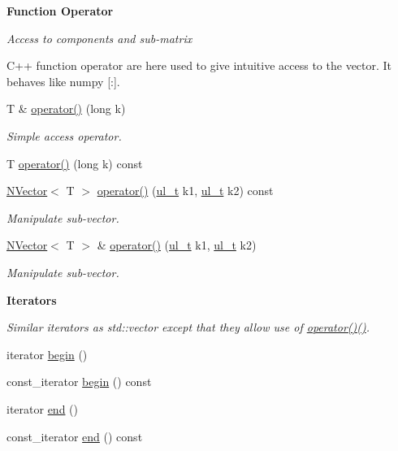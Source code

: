 \begin{Indent}\textbf{ Function Operator}\par
{\em Access to components and sub-\/matrix

C++ function operator are here used to give intuitive access to the vector. It behaves like numpy {\ttfamily \mbox{[}\+:\mbox{]}}. }\begin{DoxyCompactItemize}
\item 
T \& \mbox{\hyperlink{class_n_vector_a3ed21b63fd97af9c63bfacb372f733a5}{operator()}} (long k)
\begin{DoxyCompactList}\small\item\em Simple access operator. \end{DoxyCompactList}\item 
T \mbox{\hyperlink{class_n_vector_a51d4a2c505c1434f45e8f80d1d77eda5}{operator()}} (long k) const
\item 
\mbox{\hyperlink{class_n_vector}{N\+Vector}}$<$ T $>$ \mbox{\hyperlink{class_n_vector_a8778fdc3c0a27a7930fda3f2a7155e96}{operator()}} (\mbox{\hyperlink{group___n_algebra_ga1b140a2034db3f5dfe18a987745df43a}{ul\+\_\+t}} k1, \mbox{\hyperlink{group___n_algebra_ga1b140a2034db3f5dfe18a987745df43a}{ul\+\_\+t}} k2) const
\begin{DoxyCompactList}\small\item\em Manipulate sub-\/vector. \end{DoxyCompactList}\item 
\mbox{\hyperlink{class_n_vector}{N\+Vector}}$<$ T $>$ \& \mbox{\hyperlink{class_n_vector_a98f95a46c34ceaf355e86e9dad9863e1}{operator()}} (\mbox{\hyperlink{group___n_algebra_ga1b140a2034db3f5dfe18a987745df43a}{ul\+\_\+t}} k1, \mbox{\hyperlink{group___n_algebra_ga1b140a2034db3f5dfe18a987745df43a}{ul\+\_\+t}} k2)
\begin{DoxyCompactList}\small\item\em Manipulate sub-\/vector. \end{DoxyCompactList}\end{DoxyCompactItemize}
\end{Indent}
\begin{Indent}\textbf{ Iterators}\par
{\em Similar iterators as {\ttfamily std\+::vector} except that they allow use of {\ttfamily \mbox{\hyperlink{class_n_vector_a3ed21b63fd97af9c63bfacb372f733a5}{operator()()}}}. }\begin{DoxyCompactItemize}
\item 
iterator \mbox{\hyperlink{class_n_vector_ae71ea78f955c0512a1dd005c335f956a}{begin}} ()
\item 
const\+\_\+iterator \mbox{\hyperlink{class_n_vector_a39aa7aecfd17e2db8130f5fbc956bb8f}{begin}} () const
\item 
iterator \mbox{\hyperlink{class_n_vector_a11675cb00213e89ae5a563f59d0f4ff3}{end}} ()
\item 
const\+\_\+iterator \mbox{\hyperlink{class_n_vector_ac019e1018e5d0dd8113d2f2605aa2987}{end}} () const
\end{DoxyCompactItemize}
\end{Indent}

